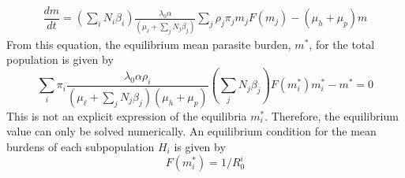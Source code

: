 \documentclass[12pt,a4paper]{article}
\theoremstyle{plain}%
\theoremstyle{definition}
\theoremstyle{remark}
\begin{document}
\begin{equation}
	\begin{split}
		\dfrac{dm}{dt}= \left( \sum_i N_i \beta_{i} \right)  
		\frac{ \lambda_0 \alpha }{(\mu_{\ell}+\sum_j N_j \beta_j  )}  
		\sum_j \rho_{j} \pi_{j} m_{j} F(m_{j})   -(\mu_{h}+\mu_p) m%
	\end{split}
\end{equation}
From this equation, the equilibrium mean parasite burden, $m^*$, for the total population is given by
\begin{equation}
	\sum_i \pi_i \frac{ \lambda_0 \alpha \rho_{i}}{ (\mu_{\ell}+\sum_j N_j \beta_j  )(\mu_{h}+\mu_p)} 
	\left( \sum_j N_{j} \beta_{j} \right) F( m^*_{i}) m^*_{i} - m^*=0 
\end{equation}
This is not an explicit expression of the equilibria $m_{i}^*$. Therefore, the equilibrium value can only be solved numerically.
An equilibrium condition for the mean burdens of each subpopulation $H_{i}$ is given by
\begin{equation}%
	F(m^*_{i})=1/R_0^{i}
\end{equation}
%	
\end{document}
